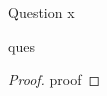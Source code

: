\begin{solution}{Question x}\label{ques:x}
    \begin{question}
    ques
    \end{question}
    \tcblower{}
    \begin{proof}
    proof
    \end{proof}
\end{solution}
 